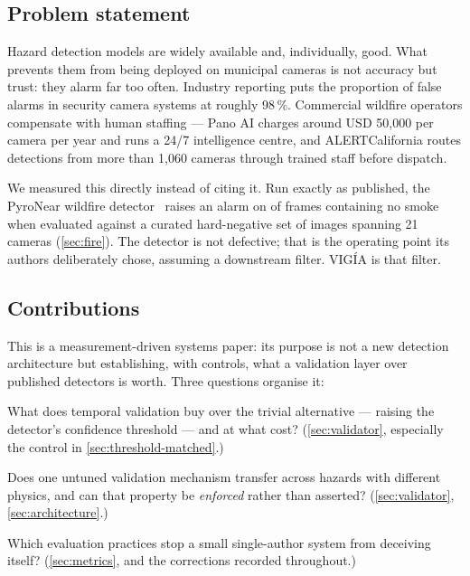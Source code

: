 \subsection{Problem statement}

Hazard detection models are widely available and, individually, good. What
prevents them from being deployed on municipal cameras is not accuracy but
trust: they alarm far too often. Industry reporting puts the proportion of
false alarms in security camera systems at roughly 98\,\%. Commercial wildfire
operators compensate with human staffing — Pano AI charges around
USD 50{,}000 per camera per year and runs a 24/7 intelligence centre, and
ALERTCalifornia routes detections from more than 1{,}060 cameras through
trained staff before dispatch.

We measured this directly instead of citing it. Run exactly as published, the
PyroNear wildfire detector~\citep{pyronear2025} raises an alarm on
\FireImageFAR{} of frames containing no smoke when evaluated against a curated
hard-negative set of \FireNegatives{} images spanning 21 cameras
(\cref{sec:fire}). The detector is not defective; that is the operating point
its authors deliberately chose, assuming a downstream filter. VIGÍA is that
filter.

\subsection{Contributions}
\label{sec:contributions}

This is a measurement-driven systems paper: its purpose is not a new
detection architecture but establishing, with controls, what a validation
layer over published detectors is worth. Three questions organise it:

\begin{description}[leftmargin=3.2em,style=sameline,font=\normalfont\bfseries]
  \item[RQ1] What does temporal validation buy over the trivial alternative —
        raising the detector's confidence threshold — and at what cost?
        (\cref{sec:validator}, especially the control in
        \cref{sec:threshold-matched}.)
  \item[RQ2] Does one untuned validation mechanism transfer across hazards
        with different physics, and can that property be \emph{enforced}
        rather than asserted? (\cref{sec:validator}, \cref{sec:architecture}.)
  \item[RQ3] Which evaluation practices stop a small single-author system
        from deceiving itself? (\cref{sec:metrics}, and the corrections
        recorded throughout.)
\end{description}

